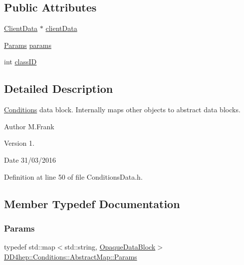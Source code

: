 \subsection*{Public Attributes}
\begin{DoxyCompactItemize}
\item 
\hyperlink{struct_d_d4hep_1_1_conditions_1_1_client_data}{Client\+Data} $\ast$ \hyperlink{class_d_d4hep_1_1_conditions_1_1_abstract_map_a4255c1d1d93eb1ecfee921ed752a54da}{client\+Data}
\item 
\hyperlink{class_d_d4hep_1_1_conditions_1_1_abstract_map_a0a7595cac22aa8ddc6f6900d7883c2fc}{Params} \hyperlink{class_d_d4hep_1_1_conditions_1_1_abstract_map_ae2e1b9489f65c31a0bb1c1851686cca4}{params}
\item 
int \hyperlink{class_d_d4hep_1_1_conditions_1_1_abstract_map_a33a343986fada98f91b7118368fa7248}{class\+ID}
\end{DoxyCompactItemize}


\subsection{Detailed Description}
\hyperlink{namespace_d_d4hep_1_1_conditions}{Conditions} data block. Internally maps other objects to abstract data blocks. 

\begin{DoxyAuthor}{Author}
M.\+Frank 
\end{DoxyAuthor}
\begin{DoxyVersion}{Version}
1. 
\end{DoxyVersion}
\begin{DoxyDate}{Date}
31/03/2016 
\end{DoxyDate}


Definition at line 50 of file Conditions\+Data.\+h.



\subsection{Member Typedef Documentation}
\hypertarget{class_d_d4hep_1_1_conditions_1_1_abstract_map_a0a7595cac22aa8ddc6f6900d7883c2fc}{}\label{class_d_d4hep_1_1_conditions_1_1_abstract_map_a0a7595cac22aa8ddc6f6900d7883c2fc} 
\subsubsection{\texorpdfstring{Params}{Params}}
{\footnotesize\ttfamily typedef std\+::map$<$std\+::string, \hyperlink{class_d_d4hep_1_1_opaque_data_block}{Opaque\+Data\+Block}$>$ \hyperlink{class_d_d4hep_1_1_conditions_1_1_abstract_map_a0a7595cac22aa8ddc6f6900d7883c2fc}{D\+D4hep\+::\+Conditions\+::\+Abstract\+Map\+::\+Params}}



